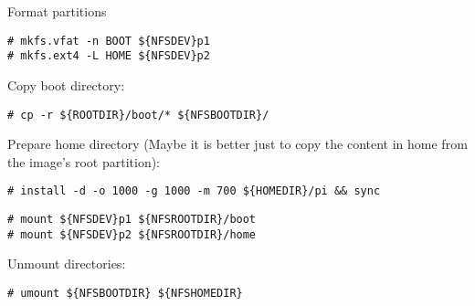 Format partitions
\begin{lstlisting}[]
# mkfs.vfat -n BOOT ${NFSDEV}p1
# mkfs.ext4 -L HOME ${NFSDEV}p2
\end{lstlisting}
\FloatBarrier
\vspace{-5mm}








Copy boot directory:
\begin{lstlisting}[]
# cp -r ${ROOTDIR}/boot/* ${NFSBOOTDIR}/ 
\end{lstlisting}
\FloatBarrier
\vspace{-5mm}



Prepare home directory (Maybe it is better just to copy the content in home from the
image's root partition):
\begin{lstlisting}[]
# install -d -o 1000 -g 1000 -m 700 ${HOMEDIR}/pi && sync
\end{lstlisting}
\FloatBarrier
\vspace{-5mm}



\begin{lstlisting}[]
# mount ${NFSDEV}p1 ${NFSROOTDIR}/boot
# mount ${NFSDEV}p2 ${NFSROOTDIR}/home
\end{lstlisting}
\FloatBarrier
\vspace{-5mm}


Unmount directories:
\begin{lstlisting}[]
# umount ${NFSBOOTDIR} ${NFSHOMEDIR}
\end{lstlisting}
\FloatBarrier
\vspace{-5mm}

